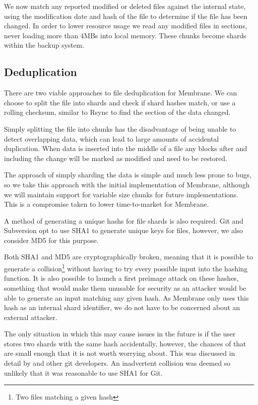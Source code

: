 \documentclass[11pt, a4paper, twoside]{report}
\begin{document}
We now match any reported modified or deleted files against the internal state, using the modification date and hash of the file to determine if the file has been changed. In order to lower resource usage we read any modified files in sections, never loading more than 4MBs into local memory. These chunks become shards within the backup system.

\subsection{Deduplication}

There are two viable approaches to file deduplication for Membrane. We can choose to split the file into shards and check if shard hashes match, or use a rolling checksum, similar to Rsync to find the section of the data changed. \citep{tridgell1996rsync}

Simply splitting the file into chunks has the disadvantage of being unable to detect overlapping data, which can lead to large amounts of accidental duplication. When data is inserted into the middle of a file any blocks after and including the change will be marked as modified and need to be restored.

The approach of simply sharding the data is simple and much less prone to bugs, so we take this approach with the initial implementation of Membrane, although we will maintain support for variable size chunks for future implementations. This is a compromise taken to lower time-to-market for Membrane.

A method of generating a unique hashs for file shards is also required. Git and Subversion opt to use SHA1 \citep{torvalds2010git} to generate unique keys for files, however, we also consider MD5 for this purpose.

Both SHA1 \citep{wang2005collision} and MD5 \citep{stevens2006fast} are cryptographically broken, meaning that it is possible to generate a collision\footnote{Two files matching a given hash} without having to try every possible input into the hashing function. It is also possible to launch a first preimage attack on these hashes, something that would make them unusable for security as an attacker would be able to generate an input matching any given hash. As Membrane only uses this hash as an internal shard identifier, we do not have to be concerned about an external attacker.

The only situation in which this may cause issues in the future is if the user stores two shards with the same hash accidentally, however, the chances of that are small enough that it is not worth worrying about. This was discussed in detail by \cite{torvalds2006gitcollisions} and other git developers. An inadvertent collision was deemed so unlikely that it was reasonable to use SHA1 for Git.
\end{document}
